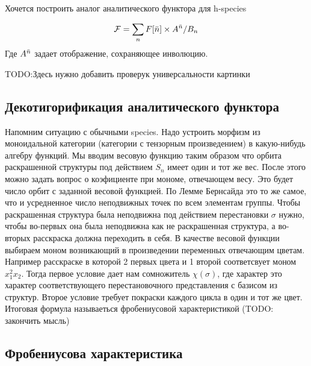 Хочется построить аналог аналитического функтора для h-species


\begin{equation}
\label{eq:h-an}
	\mathcal F = \sum\limits_n F[\Bar n] \times A^{\Bar n} / B_n
\end{equation}
Где $A^{\Bar n}$ задает отображение, сохраняющее инволюцию. 

TODO:Здесь нужно добавить проверук универсальности картинки

\subsection{Декотигорификация аналитического функтора}
Напомним ситуацию с обычными species.
Надо устроить морфизм из моноидальной категории (категории с
тензорным произведением) в какую-нибудь алгебру функций. Мы вводим весовую
функцию таким образом что орбита раскрашенной структуры под действием $S_n$ имеет один и тот же вес.
После этого можно задать вопрос о коэфициенте при мономе, отвечающем весу. Это
будет число орбит с заданной весовой функцией. По Лемме Бернсайда это то же
самое, что и усредненное число неподвижных точек по всем элементам группы. Чтобы
раскрашенная структура была неподвижна под действием перестановки $\sigma$
нужно, чтобы во-первых она была неподвижна как не раскрашенная структура, а
во-вторых расскраска должна переходить в себя. В качестве
весовой функции выбираем моном возникающий в произведении переменных отвечающим
цветам. Например расскраске в которой 2 первых цвета и 1 второй
соответсвует моном $x_1^2x_2$. Тогда первое условие дает нам сомножитель
$\chi(\sigma)$, где характер это характер соответствующего перестановочного
представления с базисом из структур. Второе условие требует покраски каждого
цикла в один и тот же цвет. Итоговая формула называеться фробениусовой характеристикой (TODO: закончить мысль)

\subsection{Фробениусова характеристика}

